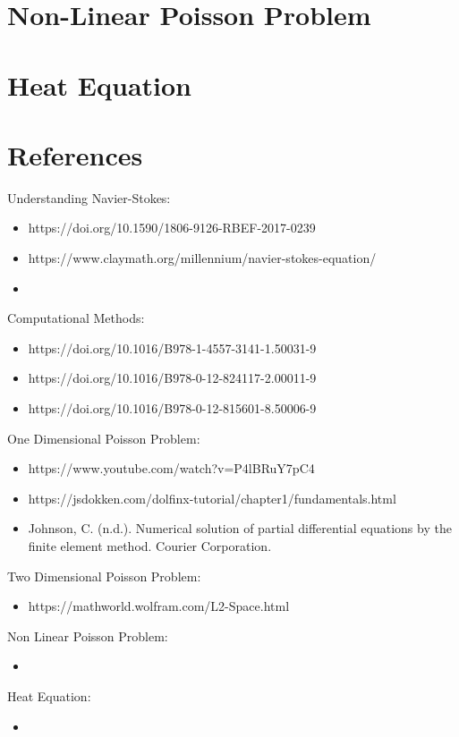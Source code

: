 \documentclass{article}
\begin{document}
\section{Non-Linear Poisson Problem}
\section{Heat Equation}
\section{References}
Understanding Navier-Stokes:
\begin{itemize}
\item https://doi.org/10.1590/1806-9126-RBEF-2017-0239
\item https://www.claymath.org/millennium/navier-stokes-equation/
\item 
\end{itemize}
Computational Methods:
\begin{itemize}
\item https://doi.org/10.1016/B978-1-4557-3141-1.50031-9
\item https://doi.org/10.1016/B978-0-12-824117-2.00011-9
\item https://doi.org/10.1016/B978-0-12-815601-8.50006-9
\end{itemize}
One Dimensional Poisson Problem:
\begin{itemize}
\item https://www.youtube.com/watch?v=P4lBRuY7pC4
\item https://jsdokken.com/dolfinx-tutorial/chapter1/fundamentals.html
\item Johnson, C. (n.d.). Numerical solution of partial differential equations by the finite element method. Courier Corporation.
\end{itemize}
Two Dimensional Poisson Problem:
\begin{itemize}
\item https://mathworld.wolfram.com/L2-Space.html
\end{itemize}
Non Linear Poisson Problem:
\begin{itemize}
\item 
\end{itemize}
Heat Equation:
\begin{itemize}
\item 
\end{itemize}
\end{document}
